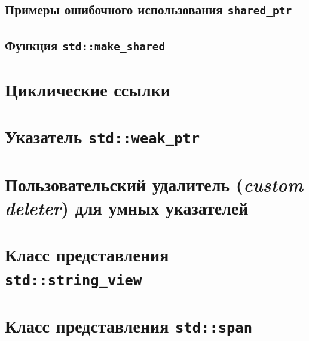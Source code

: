 \documentclass{article}
\begin{document}
\subsection*{Примеры ошибочного использования \texttt{shared\_ptr}}

\subsection*{Функция \texttt{std::make\_shared}}


\section*{Циклические ссылки}

\newpage
\section*{Указатель \texttt{std::weak\_ptr}}

\section*{Пользовательский удалитель (\textit{custom deleter}) для умных указателей}

\section*{Класс представления \texttt{std::string\_view}}

\section*{Класс представления \texttt{std::span}}
\end{document}
